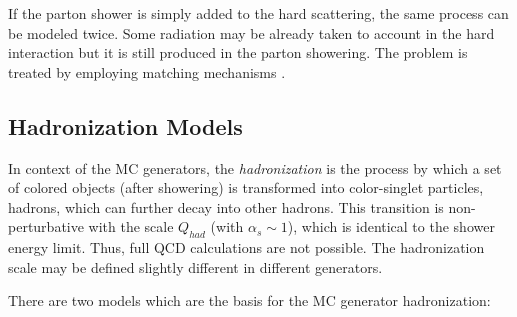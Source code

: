 If the parton shower is simply added to the hard scattering, the same process can be modeled twice. Some radiation
may be already taken to account in the hard interaction but it is still produced in the parton showering. The problem 
is treated by employing matching mechanisms \cite{Buckley:2011ms}.

\subsection{Hadronization Models}

In context of the MC generators, the \textit{hadronization} is the process by which a set of colored objects (after showering)
is transformed into color-singlet particles, hadrons, which can further decay into other hadrons. This transition is non-perturbative
with the scale $Q_{had}$ (with $\alpha_{s} \sim 1$), which is identical to the shower energy limit. Thus, full QCD calculations
are not possible. The hadronization scale may be defined slightly different in different generators.
% 

There are two models which are the basis for the MC generator hadronization:

